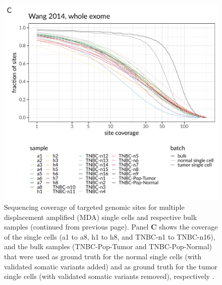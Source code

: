 \documentclass[authoryear,preprint,11pt]{scrartcl}
\begin{document}
\begin{figure}[!tpb]
 \ContinuedFloat
 \begin{minipage}{\linewidth}
  \includegraphics[width=\linewidth]{figs/Wang2014/Wang2014_coverage_dist.pdf}
 \end{minipage}
 \caption{
 Sequencing coverage of targeted genomic sites for multiple displacement amplified (MDA) single cells and respective bulk samples (continued from previous page).
 Panel \textbf{C} shows the coverage of the single cells (a1 to a8, h1 to h8, and TNBC-n1 to TNBC-n16), and the bulk samples (TNBC-Pop-Tumor and TNBC-Pop-Normal) that were used as ground truth for the normal single cells (with validated somatic variants added) and as ground truth for the tumor single cells (with validated somatic variants removed), respectively \cite{wang_clonal_2014}.
 }
 \label{fig:coverage-dists}
\end{figure}
\end{document}
